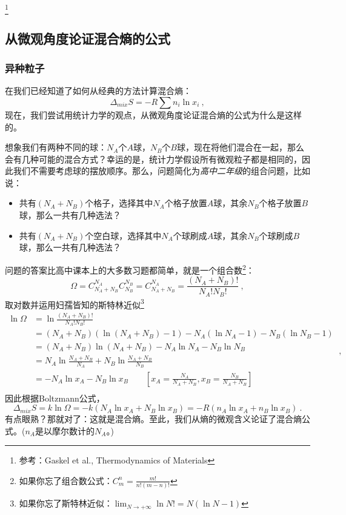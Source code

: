 


\footnote{参考：Gaskel et al., Thermodynamics of Materials}

\subsection{从微观角度论证混合熵的公式}
\subsubsection{异种粒子}
在我们已经知道了如何从经典的方法计算混合熵：
\begin{equation}
\Delta_{mix} S = - R \sum n_i \ln x_i~,
\end{equation}
现在，我们尝试用统计力学的观点，从微观角度论证混合熵的公式为什么是这样的。

想象我们有两种不同的球：$N_A$个$A$球，$N_B$个$B$球，现在将他们混合在一起，那么会有几种可能的混合方式？幸运的是，统计力学假设所有微观粒子都是相同的，因此我们不需要考虑球的摆放顺序。那么，问题简化为\textsl{高中二年级}的组合问题，比如说：
\begin{itemize}
\item 共有$(N_A+N_B)$个格子，选择其中$N_A$个格子放置$A$球，其余$N_B$个格子放置$B$球，那么一共有几种选法？
\item 共有$(N_A+N_B)$个空白球，选择其中$N_A$个球刷成$A$球，其余$N_B$个球刷成$B$球，那么一共有几种选法？
\end{itemize}
问题的答案比高中课本上的大多数习题都简单，就是一个组合数\footnote{如果你忘了组合数公式：$C^n_m = \frac{m!}{n!(m-n)!}$}：
\begin{equation}
\Omega = C^{N_A}_{N_A+N_B} C^{N_B}_{N_B} =  C^{N_A}_{N_A+N_B}  = \frac{(N_A+N_B)!}{N_A!N_B!}~,
\end{equation}
取对数并运用妇孺皆知的斯特林近似\footnote{如果你忘了斯特林近似：$\lim_{N \to +\infty} \ln N! = N (\ln N -1)$}
\begin{equation}\label{eq_MICMXS_1}
\begin{aligned}
\ln \Omega &= \ln \frac{(N_A+N_B)!}{N_A!N_B!} \\
 &= (N_A+N_B) (\ln (N_A+N_B) - 1) - N_A (\ln N_A - 1) - N_B (\ln N_B - 1) \\
 &= (N_A+N_B) \ln (N_A+N_B) - N_A \ln N_A - N_B \ln N_B \\
 &= N_A \ln \frac{N_A+N_B}{N_A} + N_B \ln \frac{N_A+N_B}{N_B} \\
 &= - N_A \ln x_A - N_B \ln x_B \qquad \left [x_A = \frac{N_A}{N_A+N_B}, x_B = \frac{N_B}{N_A+N_B} \right ]\\
\end{aligned}~,
\end{equation}
因此根据Boltzmann公式，
\begin{equation}
\Delta_{mix} S = k \ln \Omega = - k(N_A \ln x_A + N_B \ln x_B) = - R(n_A \ln x_A + n_B \ln x_B) ~.
\end{equation}
有点眼熟？那就对了：这就是混合熵。至此，我们从熵的微观含义论证了混合熵公式。($n_A$是以摩尔数计的$N_A$。)

